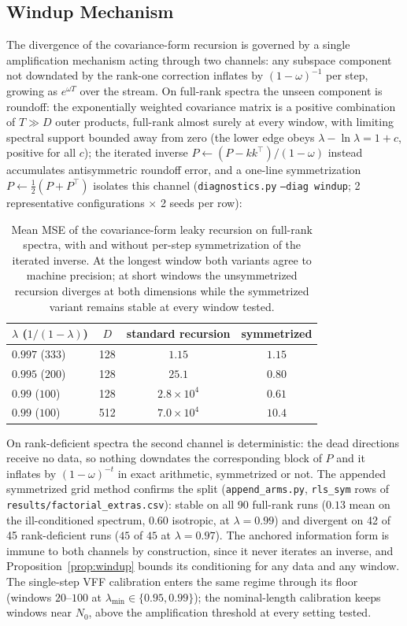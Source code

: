 \documentclass[11pt]{article}
\begin{document}
\subsection{Windup Mechanism}
The divergence of the covariance-form recursion is governed by a single amplification mechanism acting through two channels: any subspace component not downdated by the rank-one correction inflates by $(1{-}\omega)^{-1}$ per step, growing as $e^{\omega T}$ over the stream.
On full-rank spectra the unseen component is roundoff: the exponentially weighted covariance matrix is a positive combination of $T \gg D$ outer products, full-rank almost surely at every window, with limiting spectral support bounded away from zero (the lower edge obeys $\lambda - \ln\lambda = 1 + c$, positive for all $c$); the iterated inverse $P \leftarrow (P - kk^\top)/(1{-}\omega)$ instead accumulates antisymmetric roundoff error, and a one-line symmetrization $P \leftarrow \tfrac12(P + P^\top)$ isolates this channel (\texttt{diagnostics.py} \texttt{--diag windup}; 2 representative configurations $\times$ 2 seeds per row):

\begin{table}[h]
\centering
\small
\caption{Mean MSE of the covariance-form leaky recursion on full-rank spectra, with and without per-step symmetrization of the iterated inverse.
At the longest window both variants agree to machine precision; at short windows the unsymmetrized recursion diverges at both dimensions while the symmetrized variant remains stable at every window tested.}
\label{tab:windup-mech}
\begin{tabular}{lccc}
\toprule
$\lambda$ ($1/(1-\lambda)$) & $D$ & standard recursion & symmetrized \\
\midrule
$0.997$ ($333$) & 128 & $1.15$ & $1.15$ \\
$0.995$ ($200$) & 128 & $25.1$ & $0.80$ \\
$0.99$ ($100$) & 128 & $2.8 \times 10^{4}$ & $0.61$ \\
$0.99$ ($100$) & 512 & $7.0 \times 10^{4}$ & $10.4$ \\
\bottomrule
\end{tabular}
\end{table}

On rank-deficient spectra the second channel is deterministic: the dead directions receive no data, so nothing downdates the corresponding block of $P$ and it inflates by $(1{-}\omega)^{-t}$ in exact arithmetic, symmetrized or not.
The appended symmetrized grid method confirms the split (\texttt{append\_arms.py}, \texttt{rls\_sym} rows of \texttt{results/factorial\_extras.csv}): stable on all 90 full-rank runs ($0.13$ mean on the ill-conditioned spectrum, $0.60$ isotropic, at $\lambda = 0.99$) and divergent on 42 of 45 rank-deficient runs ($45$ of $45$ at $\lambda = 0.97$).
The anchored information form is immune to both channels by construction, since it never iterates an inverse, and Proposition~\ref{prop:windup} bounds its conditioning for any data and any window.
The single-step VFF calibration enters the same regime through its floor (windows $20$--$100$ at $\lambda_{\min} \in \{0.95, 0.99\}$); the nominal-length calibration keeps windows near $N_0$, above the amplification threshold at every setting tested.
\end{document}

